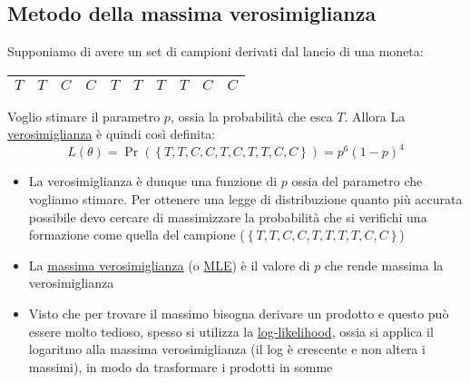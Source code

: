 \subsection{Metodo della massima verosimiglianza}
Supponiamo di avere un set di campioni derivati dal lancio di una moneta:
\begin{center}
	\begin{tabular}{|cccccccccc|}
		\hline
		$T$ & $ T$ & $C $ & $C $ & $T $ & $T $ & $T $ & $ T$ & $ C$ & $ C$ \\
		\hline
	\end{tabular}
\end{center}
Voglio stimare il parametro $ p $, ossia la probabilità che esca $ T $. Allora
La \underline{verosimiglianza} è quindi così definita: 
\[
  L\left(\theta \right) = \Pr \left(\left\{T,T,C,C,T,C,T,T,C,C\right\}\right) = p^{6} \left(1-p\right)^{4}
\]
\begin{itemize}
  \item La verosimiglianza è dunque una funzione di $ p $ ossia del parametro che vogliamo stimare. Per ottenere una legge di distribuzione quanto più accurata possibile devo cercare di massimizzare la probabilità che si verifichi una formazione come quella del campione ($ \left\{T,T,C,C,T,T,T,T,C,C\right\} $)
  \item La \underline{massima verosimiglianza} (o \underline{MLE}) è il valore di $ p $ che rende massima la verosimiglianza
  \item Visto che per trovare il massimo bisogna derivare un prodotto e questo può essere molto tedioso, spesso si utilizza la \underline{log-likelihood}, ossia si applica il logaritmo alla massima verosimiglianza (il log è crescente e non altera i massimi), in modo da trasformare i prodotti in somme
\end{itemize}
